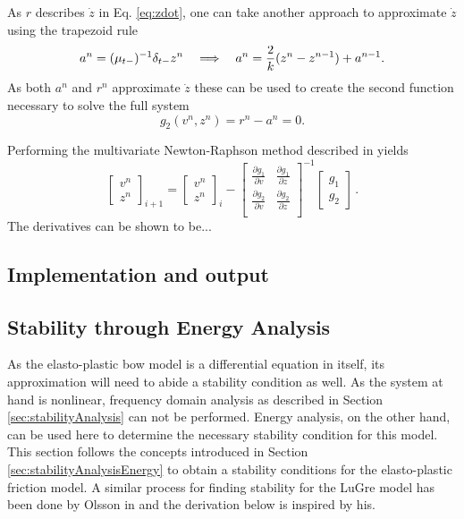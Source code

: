 As $r$ describes $\dot z$ in Eq. \eqref{eq:zdot}, one can take another approach to approximate $\dot z$ using the trapezoid rule \cite{theBible}
\begin{equation}
    a^n = (\mu_{t-})^{-1}\delta_{t-} z^n \quad \Longrightarrow\quad a^n = \frac{2}{k}(z^n - z^{n-1}) + a^{n-1}.
\end{equation}
As both $a^n$ and $r^n$ approximate $\dot z$ these can be used to create the second function necessary to solve the full system
\begin{equation}
    g_2(v^n, z^n) = r^n - a^n = 0.
\end{equation}

Performing the multivariate Newton-Raphson method described in yields
\begin{equation}\label{eq:NRit}
    \begin{bmatrix}
    v^n\\
    z^n
    \end{bmatrix}_{i+1}
    =
    \begin{bmatrix}
    v^n\\
    z^n
    \end{bmatrix}_i
    -
    \begin{bmatrix}
    \frac{\partial g_1}{\partial v} & \frac{\partial g_1}{\partial z}\\
    \frac{\partial g_2}{\partial v} & \frac{\partial g_2}{\partial z}\\
    \end{bmatrix}^{-1}
    \begin{bmatrix}
    g_1\\
    g_2
    \end{bmatrix}\,
    .
\end{equation}
The derivatives can be shown to be... 

\subsection{Implementation and output}
\subsection{Stability through Energy Analysis}
As the elasto-plastic bow model is a differential equation in itself, its approximation will need to abide a stability condition as well.
As the system at hand is nonlinear, frequency domain analysis as described in Section \ref{sec:stabilityAnalysis} can not be performed. Energy analysis, on the other hand, can be used here to determine the necessary stability condition for this model. This section follows the concepts introduced in Section \ref{sec:stabilityAnalysisEnergy} to obtain a stability conditions for the elasto-plastic friction model. A similar process for finding stability for the LuGre model has been done by Olsson in \cite[p. 55]{Olsson1996} and the derivation below is inspired by his. 

